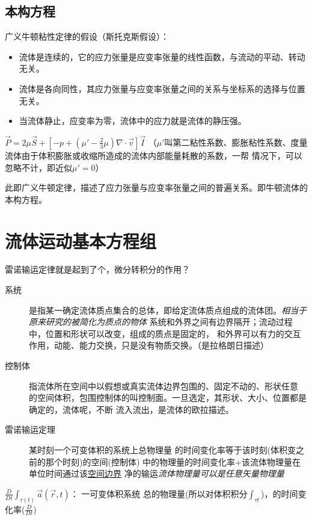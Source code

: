 \documentclass[UTF8,12pt]{article}
\begin{document}
\subsection{本构方程}

广义牛顿粘性定律的假设（斯托克斯假设）：
\begin{itemize}
    \item 流体是连续的，它的应力张量是应变率张量的线性函数，与流动的平动、转动无关。
    \item 流体是各向同性，其应力张量与应变率张量之间的关系与坐标系的选择与位置无关。
    \item 当流体静止，应变率为零，流体中的应力就是流体的静压强。
\end{itemize}

$\vec P = 2\mu \vec S + [-p+(\mu' - \frac{2}{3}\mu)\nabla\cdot\vec v]\vec I$
（$\mu'$叫第二粘性系数、膨胀粘性系数、度量流体由于体积膨胀或收缩所造成的流体内部能量耗散的系数，一帮
情况下，可以忽略不计，即近似$\mu'=0$）

此即广义牛顿定律，描述了应力张量与应变率张量之间的普遍关系。即牛顿流体的本构方程。

\newpage
\section{流体运动基本方程组}

雷诺输运定律就是起到了个，微分转积分的作用？

\begin{description}
    \item[系统] 是指某一确定流体质点集合的总体，即给定流体质点组成的流体团。\emph{相当于原来研究的被简化为质点的物体}
    系统和外界之间有边界隔开；流动过程中，位置和形状可以改变，组成的质点是固定的，
    和外界可以有力的交互作用，动能、能力交换，只是没有物质交换。（是拉格朗日描述）
    \item[控制体] 指流体所在空间中以假想或真实流体边界包围的、固定不动的、形状任意 
    的空间体积，包围控制体的叫控制面。一旦选定，其形状、大小、位置都是确定的，流体呢，不断
    流入流出，是流体的欧拉描述。
    \item[雷诺输运定理] 某时刻一个可变体积的系统上总物理量
    的时间变化率等于该时刻(体积变之前的那个时刻)的空间(控制体)
    中的物理量的时间变化率$+$该流体物理量在单位时间通过该\uline{空间边界}
    净的输运\emph{流体物理量可以是任意矢量物理量}
\end{description}

$\frac{D}{Dt} \int_{\tau(t)} \vec a(\vec r,t)$：
一可变体积系统{\color{red} 总}的物理量(所以对体积积分$\int_{\tau t}$)，的时间变化率($\frac{D}{Dt}$)
\end{document}
